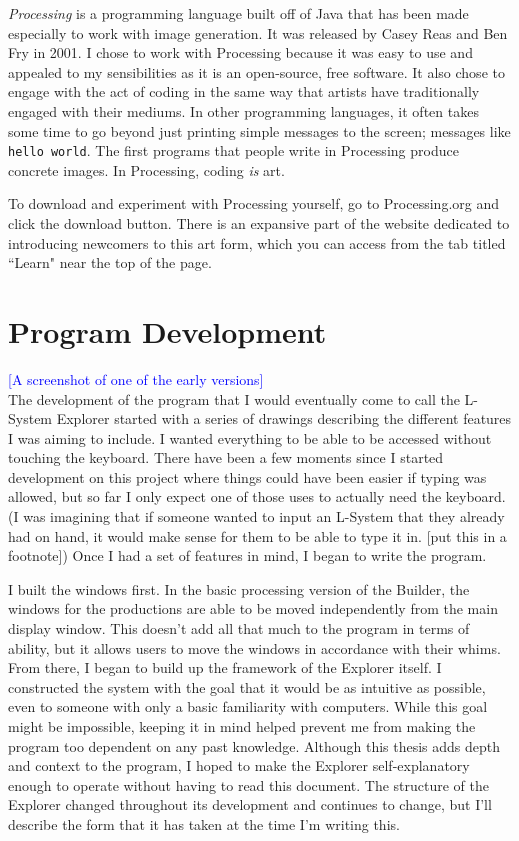 \documentclass[12pt,twoside]{reedthesis}
\newcommand{\code}[1]{\texttt{#1}}
\begin{document}
	\textit{Processing} is a programming language built off of Java that has been made especially to work with image generation. It was released by Casey Reas and Ben Fry in 2001. I chose to work with Processing because it was easy to use and appealed to my sensibilities as it is an open-source, free software. It also chose to engage with the act of coding in the same way that artists have traditionally engaged with their mediums. In other programming languages, it often takes some time to go beyond just printing simple messages to the screen; messages like \code{hello world}. The first programs that people write in Processing produce concrete images. In Processing, coding \textit{is} art.
	
	To download and experiment with Processing yourself, go to Processing.org and click the download button. There is an expansive part of the website dedicated to introducing newcomers to this art form, which you can access from the tab titled ``Learn" near the top of the page.

\section{Program Development}

	\textcolor{blue}{[A screenshot of one of the early versions]}\\

	The development of the program that I would eventually come to call the L-System Explorer started with a series of drawings describing the different features I was aiming to include. I wanted everything to be able to be accessed without touching the keyboard. There have been a few moments since I started development on this project where things could have been easier if typing was allowed, but so far I only expect one of those uses to actually need the keyboard. (I was imagining that if someone wanted to input an L-System that they already had on hand, it would make sense for them to be able to type it in. [put this in a footnote]) Once I had a set of features in mind, I began to write the program.
	
	I built the windows first. In the basic processing version of the Builder, the windows for the productions are able to be moved independently from the main display window. This doesn't add all that much to the program in terms of ability, but it allows users to move the windows in accordance with their whims. From there, I began to build up the framework of the Explorer itself. I constructed the system with the goal that it would be as intuitive as possible, even to someone with only a basic familiarity with computers. While this goal might be impossible, keeping it in mind helped prevent me from making the program too dependent on any past knowledge. Although this thesis adds depth and context to the program, I hoped to make the Explorer self-explanatory enough to operate without having to read this document. The structure of the Explorer changed throughout its development and continues to change, but I'll describe the form that it has taken at the time I'm writing this.\\
	
\end{document}

